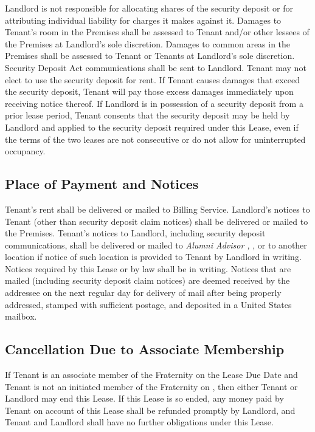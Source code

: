 \documentclass{article}
\begin{document}
Landlord is not responsible for allocating shares of the security deposit or for
attributing individual liability for charges it makes against it. Damages to
Tenant’s room in the Premises shall be assessed to Tenant and/or other lessees
of the Premises at Landlord’s sole discretion. Damages to common areas in the
Premises shall be assessed to Tenant or Tenants at Landlord’s sole discretion.
Security Deposit Act communications shall be sent to Landlord. Tenant may not
elect to use the security deposit for rent. If Tenant causes damages that exceed
the security deposit, Tenant will pay those excess damages immediately upon
receiving notice thereof. If Landlord is in possession of a security deposit
from a prior lease period, Tenant consents that the security deposit may be held
by Landlord and applied to the security deposit required under this Lease, even
if the terms of the two leases are not consecutive or do not allow for
uninterrupted occupancy.

\subsection{Place of Payment and Notices}
Tenant’s rent shall be delivered or mailed to Billing Service. Landlord’s
notices to Tenant (other than security deposit claim notices) shall be delivered
or mailed to the Premises. Tenant’s notices to Landlord, including security
deposit communications, shall be delivered or mailed to \emph{Alumni Advisor
\AlumniAdvisorName, \AlumniAdvisorAddress}, or to another location if notice of
such location is provided to Tenant by Landlord in writing. Notices required by
this Lease or by law shall be in writing. Notices that are mailed (including
security deposit claim notices) are deemed received by the addressee on the next
regular day for delivery of mail after being properly addressed, stamped with
sufficient postage, and deposited in a United States mailbox.

\subsection{Cancellation Due to Associate Membership}
If Tenant is an associate member of the Fraternity on the Lease Due Date and
Tenant is not an initiated member of the Fraternity on
, then either Tenant or Landlord
may end this Lease. If this Lease is so ended, any money paid by Tenant on
account of this Lease shall be refunded promptly by Landlord, and Tenant and
Landlord shall have no further obligations under this Lease.
\end{document}
